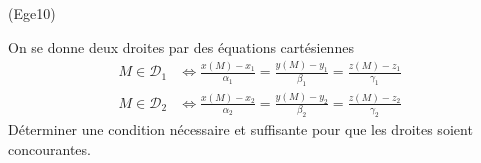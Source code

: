 \begin{tiny}(Ege10)\end{tiny} On se donne deux droites par des équations cartésiennes
\begin{align*}
 M\in \mathcal D_1 &\Leftrightarrow \frac{x(M)-x_1}{\alpha_1}=\frac{y(M)-y_1}{\beta_1}=\frac{z(M)-z_1}{\gamma_1}\\
 M\in \mathcal D_2 &\Leftrightarrow \frac{x(M)-x_2}{\alpha_2}=\frac{y(M)-y_2}{\beta_2}=\frac{z(M)-z_2}{\gamma_2}
\end{align*}
Déterminer une condition nécessaire et suffisante pour que les droites soient concourantes.